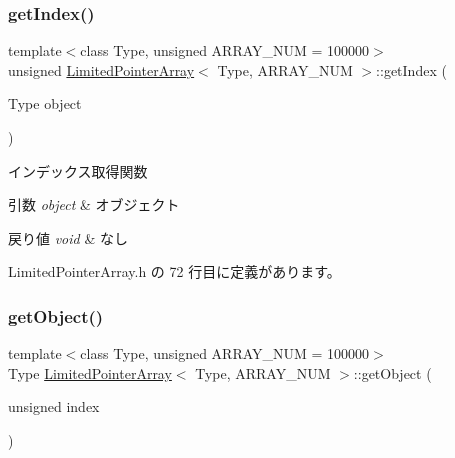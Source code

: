 \subsubsection{\texorpdfstring{get\+Index()}{getIndex()}}
{\footnotesize\ttfamily template$<$class Type, unsigned A\+R\+R\+A\+Y\+\_\+\+N\+UM = 100000$>$ \\
unsigned \mbox{\hyperlink{class_limited_pointer_array}{Limited\+Pointer\+Array}}$<$ Type, A\+R\+R\+A\+Y\+\_\+\+N\+UM $>$\+::get\+Index (\begin{DoxyParamCaption}\item[{Type}]{object }\end{DoxyParamCaption})\hspace{0.3cm}{\ttfamily [inline]}}



インデックス取得関数 


\begin{DoxyParams}{引数}
{\em object} & オブジェクト \\
\hline
\end{DoxyParams}

\begin{DoxyRetVals}{戻り値}
{\em void} & なし \\
\hline
\end{DoxyRetVals}


 Limited\+Pointer\+Array.\+h の 72 行目に定義があります。

\mbox{\label{class_limited_pointer_array_ae331bf4564035b62b9e8f08ff989be54}} 
\subsubsection{\texorpdfstring{get\+Object()}{getObject()}}
{\footnotesize\ttfamily template$<$class Type, unsigned A\+R\+R\+A\+Y\+\_\+\+N\+UM = 100000$>$ \\
Type \mbox{\hyperlink{class_limited_pointer_array}{Limited\+Pointer\+Array}}$<$ Type, A\+R\+R\+A\+Y\+\_\+\+N\+UM $>$\+::get\+Object (\begin{DoxyParamCaption}\item[{unsigned}]{index }\end{DoxyParamCaption})\hspace{0.3cm}{\ttfamily [inline]}}



